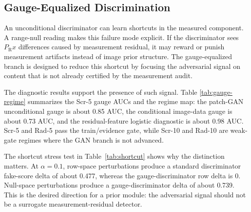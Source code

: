 \documentclass[journal]{IEEEtran}
\newcommand{\PR}{P_{\mathrm{R}}}
\begin{document}
\subsection{Gauge-Equalized Discrimination}

An unconditional discriminator can learn shortcuts in the measured component.  A
range-null reading makes this failure mode explicit.  If the discriminator sees
$\PR\hat{x}$ differences caused by measurement residual, it may reward or punish
measurement artifacts instead of image prior structure.  The gauge-equalized
branch is designed to reduce this shortcut by focusing the adversarial signal on
content that is not already certified by the measurement audit.

The diagnostic results support the presence of such signal.  Table
\ref{tab:gauge-regime} summarizes the Scr-5 gauge AUCs and the regime
map: the patch-GAN unconditional gauge is about 0.85 AUC, the conditional
image-data gauge is about 0.73 AUC, and the residual-feature logistic diagnostic
is about 0.98 AUC.  Scr-5 and Rad-5 pass the train/evidence gate, while Scr-10
and Rad-10 are weak-gate regimes where the GAN branch is not advanced.

\begin{table}[t]
\centering
\caption{Gauge diagnostics and regime gating.  The GAN branch is used only where
the diagnostic signal is present; weak-gate 10\% regimes are stopped rather than
used for a quality claim.}
\label{tab:gauge-regime}
\footnotesize
{}
\end{table}

The shortcut stress test in Table~\ref{tab:shortcut} shows why the distinction
matters.  At $\alpha=0.1$, row-space perturbations produce a standard
discriminator fake-score delta of about 0.477, whereas the gauge-discriminator
row delta is 0.  Null-space perturbations produce a gauge-discriminator delta
of about 0.739.  This is the desired direction for a prior module: the
adversarial signal should not be a surrogate measurement-residual detector.
\end{document}
